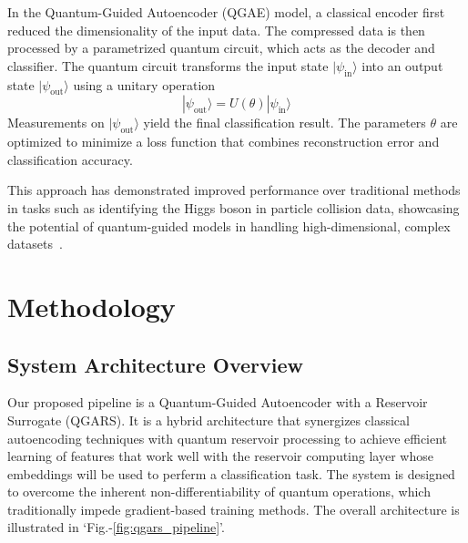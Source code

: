 \documentclass[conference]{IEEEtran}
\begin{document}
In the Quantum-Guided Autoencoder (QGAE) model, a 
classical encoder first reduced the dimensionality
of the input data. The compressed data is then processed 
by a parametrized quantum circuit, which acts as the decoder
and classifier. The quantum circuit transforms the 
input state \( |\psi_{\text{in}}\rangle \) into an
output state \( |\psi_{\text{out}}\rangle \) using a unitary operation
\begin{equation}
    |\psi_{\text{out}}\rangle = U(\theta) |\psi_{\text{in}}\rangle
\end{equation}
Measurements on \( |\psi_{\text{out}}\rangle \) yield the final
classification result. The parameters \( \theta \) are
optimized to minimize a loss function that combines
reconstruction error and classification accuracy.


This approach has demonstrated improved performance 
over traditional methods in tasks such as identifying 
the Higgs boson in particle collision data, 
showcasing the potential of quantum-guided models in 
handling high-dimensional, complex datasets~\cite{belisGuidedQuantumCompression2024}.

\section{Methodology}
\subsection{System Architecture Overview}
Our proposed pipeline is a Quantum-Guided Autoencoder with a 
Reservoir Surrogate (QGARS). It is a hybrid architecture that 
synergizes classical autoencoding techniques with quantum 
reservoir processing to achieve efficient learning of features
that work well with the reservoir computing layer whose embeddings
will be used to perferm a classification task.
The system is designed to overcome the inherent non-differentiability of quantum operations, which traditionally impede gradient-based training methods.
The overall architecture is illustrated in `Fig.-\ref{fig:qgars_pipeline}'.
\end{document}
